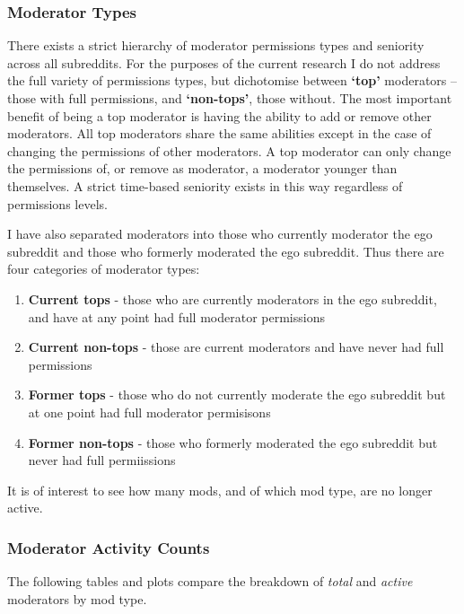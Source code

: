 \documentclass[11pt]{article}
\providecommand{\tightlist}{%
      \setlength{\itemsep}{0pt}\setlength{\parskip}{0pt}}
\begin{document}
\subsubsection{Moderator Types}\label{moderator-types}

There exists a strict hierarchy of moderator permissions types and
seniority across all subreddits. For the purposes of the current
research I do not address the full variety of permissions types, but
dichotomise between \textbf{`top'} moderators -- those with full
permissions, and \textbf{`non-tops'}, those without. The most important
benefit of being a top moderator is having the ability to add or remove
other moderators. All top moderators share the same abilities except in
the case of changing the permissions of other moderators. A top
moderator can only change the permissions of, or remove as moderator, a
moderator younger than themselves. A strict time-based seniority exists
in this way regardless of permissions levels.

I have also separated moderators into those who currently moderator the
ego subreddit and those who formerly moderated the ego subreddit. Thus
there are four categories of moderator types:

\begin{enumerate}
\def\labelenumi{\arabic{enumi}.}
\tightlist
\item
  \textbf{Current tops} - those who are currently moderators in the ego
  subreddit, and have at any point had full moderator permissions
\item
  \textbf{Current non-tops} - those are current moderators and have
  never had full permissions
\item
  \textbf{Former tops} - those who do not currently moderate the ego
  subreddit but at one point had full moderator permisisons
\item
  \textbf{Former non-tops} - those who formerly moderated the ego
  subreddit but never had full permiissions
\end{enumerate}

It is of interest to see how many mods, and of which mod type, are no
longer active.

\subsubsection{Moderator Activity
Counts}\label{moderator-activity-counts}

The following tables and plots compare the breakdown of \emph{total} and
\emph{active} moderators by mod type.
\end{document}
